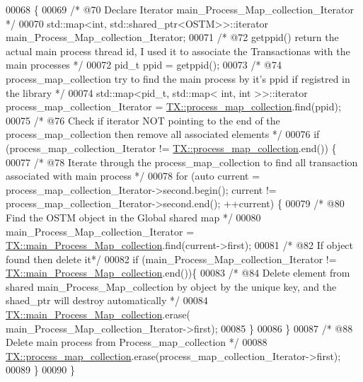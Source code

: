 \begin{DoxyCode}
00068                    \{
00069     \textcolor{comment}{/* @70 Declare Iterator main\_Process\_Map\_collection\_Iterator */}
00070     std::map<int, std::shared\_ptr<OSTM>>::iterator main\_Process\_Map\_collection\_Iterator;
00071     \textcolor{comment}{/* @72 getppid() return the actual main process thread id, I used it to associate the Transactionas
       with the main processes */}
00072     pid\_t ppid = getppid();
00073     \textcolor{comment}{/* @74 process\_map\_collection try to find the main process by it's ppid if registred in the library */}
00074     std::map<pid\_t, std::map< int, int >>::iterator process\_map\_collection\_Iterator = 
      \hyperlink{class_t_x_a2e3cd2f52fd93cf6ef3eb3c1cb830b9f_a2e3cd2f52fd93cf6ef3eb3c1cb830b9f}{TX::process\_map\_collection}.find(ppid);
00075     \textcolor{comment}{/* @76 Check if iterator NOT pointing to the end of the process\_map\_collection then remove all
       associated elements */}
00076     \textcolor{keywordflow}{if} (process\_map\_collection\_Iterator != \hyperlink{class_t_x_a2e3cd2f52fd93cf6ef3eb3c1cb830b9f_a2e3cd2f52fd93cf6ef3eb3c1cb830b9f}{TX::process\_map\_collection}.end()) \{
00077         \textcolor{comment}{/* @78 Iterate through the process\_map\_collection to find all transaction associated with main
       process */}
00078         \textcolor{keywordflow}{for} (\textcolor{keyword}{auto} current = process\_map\_collection\_Iterator->second.begin(); current != 
      process\_map\_collection\_Iterator->second.end(); ++current) \{
00079             \textcolor{comment}{/* @80 Find the OSTM object in the Global shared map */}
00080             main\_Process\_Map\_collection\_Iterator = 
      \hyperlink{class_t_x_a1a45d726894190695314464d7cd97c29_a1a45d726894190695314464d7cd97c29}{TX::main\_Process\_Map\_collection}.find(current->first);
00081             \textcolor{comment}{/* @82 If object found then delete it*/}
00082             \textcolor{keywordflow}{if} (main\_Process\_Map\_collection\_Iterator != 
      \hyperlink{class_t_x_a1a45d726894190695314464d7cd97c29_a1a45d726894190695314464d7cd97c29}{TX::main\_Process\_Map\_collection}.end())\{
00083                 \textcolor{comment}{/* @84 Delete element from shared main\_Process\_Map\_collection by object by the unique key,
       and the shaed\_ptr will destroy automatically */}
00084                 \hyperlink{class_t_x_a1a45d726894190695314464d7cd97c29_a1a45d726894190695314464d7cd97c29}{TX::main\_Process\_Map\_collection}.erase(
      main\_Process\_Map\_collection\_Iterator->first);      
00085             \}
00086         \}
00087         \textcolor{comment}{/* @88 Delete main process from Process\_map\_collection */}
00088         \hyperlink{class_t_x_a2e3cd2f52fd93cf6ef3eb3c1cb830b9f_a2e3cd2f52fd93cf6ef3eb3c1cb830b9f}{TX::process\_map\_collection}.erase(process\_map\_collection\_Iterator->first);
00089     \}
00090 \}
\end{DoxyCode}
